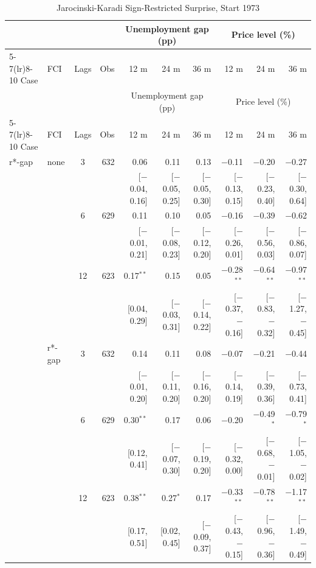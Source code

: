\begingroup\scriptsize\setlength{\tabcolsep}{0.9pt}
\begin{longtable}{llcrrrrrrr}
\caption{Jarocinski-Karadi Sign-Restricted Surprise, Start 1973}\label{tab:appR5b73}\\
\toprule
 & & & & \multicolumn{3}{c}{Unemployment gap (pp)} & \multicolumn{3}{c}{Price level (\%)}\\ \cmidrule(lr){5-7}\cmidrule(lr){8-10}
Case & FCI & Lags & Obs & 12 m & 24 m & 36 m & 12 m & 24 m & 36 m\\
\midrule\endfirsthead
\toprule
 & & & & \multicolumn{3}{c}{Unemployment gap (pp)} & \multicolumn{3}{c}{Price level (\%)}\\ \cmidrule(lr){5-7}\cmidrule(lr){8-10}
Case & FCI & Lags & Obs & 12 m & 24 m & 36 m & 12 m & 24 m & 36 m\\
\midrule\endhead
\bottomrule\endfoot
r*-gap & none & 3 & 632 & 0.06 & 0.11 & 0.13 & $-$0.11 & $-$0.20 & $-$0.27\\
 & & & & {\scriptsize [$-$0.04, 0.16]} & {\scriptsize [$-$0.05, 0.25]} & {\scriptsize [$-$0.05, 0.30]} & {\scriptsize [$-$0.13, 0.15]} & {\scriptsize [$-$0.23, 0.40]} & {\scriptsize [$-$0.30, 0.64]}\\
 &  & 6 & 629 & 0.11 & 0.10 & 0.05 & $-$0.16 & $-$0.39 & $-$0.62\\
 & & & & {\scriptsize [$-$0.01, 0.21]} & {\scriptsize [$-$0.08, 0.23]} & {\scriptsize [$-$0.12, 0.20]} & {\scriptsize [$-$0.26, 0.01]} & {\scriptsize [$-$0.56, 0.03]} & {\scriptsize [$-$0.86, 0.07]}\\
 &  & 12 & 623 & 0.17$^{**}$ & 0.15 & 0.05 & $-$0.28$^{**}$ & $-$0.64$^{**}$ & $-$0.97$^{**}$\\
 & & & & {\scriptsize [0.04, 0.29]} & {\scriptsize [$-$0.03, 0.31]} & {\scriptsize [$-$0.14, 0.22]} & {\scriptsize [$-$0.37, $-$0.16]} & {\scriptsize [$-$0.83, $-$0.32]} & {\scriptsize [$-$1.27, $-$0.45]}\\
 & r*-gap & 3 & 632 & 0.14 & 0.11 & 0.08 & $-$0.07 & $-$0.21 & $-$0.44\\
 & & & & {\scriptsize [$-$0.01, 0.20]} & {\scriptsize [$-$0.11, 0.20]} & {\scriptsize [$-$0.16, 0.20]} & {\scriptsize [$-$0.14, 0.19]} & {\scriptsize [$-$0.39, 0.36]} & {\scriptsize [$-$0.73, 0.41]}\\
 &  & 6 & 629 & 0.30$^{**}$ & 0.17 & 0.06 & $-$0.20 & $-$0.49$^{*}$ & $-$0.79$^{*}$\\
 & & & & {\scriptsize [0.12, 0.41]} & {\scriptsize [$-$0.07, 0.30]} & {\scriptsize [$-$0.19, 0.20]} & {\scriptsize [$-$0.32, 0.00]} & {\scriptsize [$-$0.68, $-$0.01]} & {\scriptsize [$-$1.05, $-$0.02]}\\
 &  & 12 & 623 & 0.38$^{**}$ & 0.27$^{*}$ & 0.17 & $-$0.33$^{**}$ & $-$0.78$^{**}$ & $-$1.17$^{**}$\\
 & & & & {\scriptsize [0.17, 0.51]} & {\scriptsize [0.02, 0.45]} & {\scriptsize [$-$0.09, 0.37]} & {\scriptsize [$-$0.43, $-$0.15]} & {\scriptsize [$-$0.96, $-$0.36]} & {\scriptsize [$-$1.49, $-$0.49]}\\
\end{longtable}
